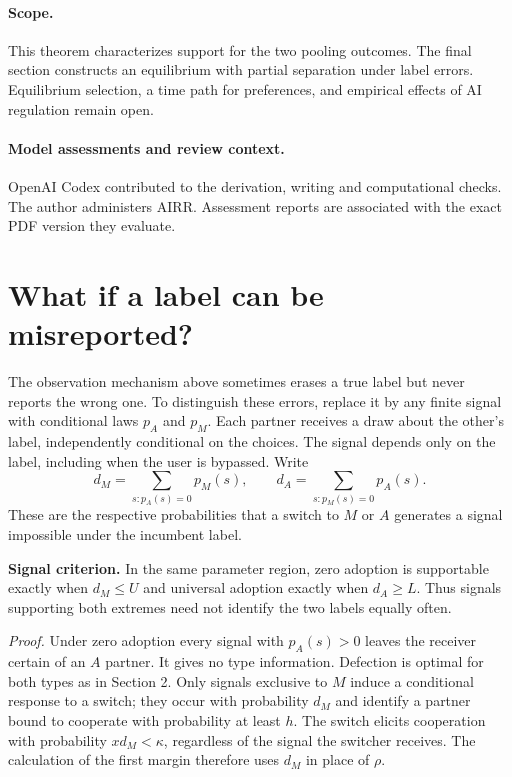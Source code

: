 \documentclass[11pt]{article}
\begin{document}
\paragraph{Scope.}
This theorem characterizes support for the two pooling outcomes. The final section constructs an equilibrium with partial separation under label errors. Equilibrium selection, a time path for preferences, and empirical effects of AI regulation remain open.

\paragraph{Model assessments and review context.}
OpenAI Codex contributed to the derivation, writing and computational checks. The author administers AIRR. Assessment reports are associated with the exact PDF version they evaluate.

\newpage
\section{What if a label can be misreported?}
The observation mechanism above sometimes erases a true label but never reports the wrong one. To distinguish these errors, replace it by any finite signal with conditional laws $p_A$ and $p_M$. Each partner receives a draw about the other's label, independently conditional on the choices. The signal depends only on the label, including when the user is bypassed. Write
\[
  d_M=\sum_{s:p_A(s)=0}p_M(s),\qquad
  d_A=\sum_{s:p_M(s)=0}p_A(s).
\]
These are the respective probabilities that a switch to $M$ or $A$ generates a signal impossible under the incumbent label.

\textbf{Signal criterion.} In the same parameter region, zero adoption is supportable exactly when $d_M\le U$ and universal adoption exactly when $d_A\ge L$. Thus signals supporting both extremes need not identify the two labels equally often.

\emph{Proof.} Under zero adoption every signal with $p_A(s)>0$ leaves the receiver certain of an $A$ partner. It gives no type information. Defection is optimal for both types as in Section 2. Only signals exclusive to $M$ induce a conditional response to a switch; they occur with probability $d_M$ and identify a partner bound to cooperate with probability at least $h$. The switch elicits cooperation with probability $xd_M<\kappa$, regardless of the signal the switcher receives. The calculation of the first margin therefore uses $d_M$ in place of $\rho$.
\end{document}
